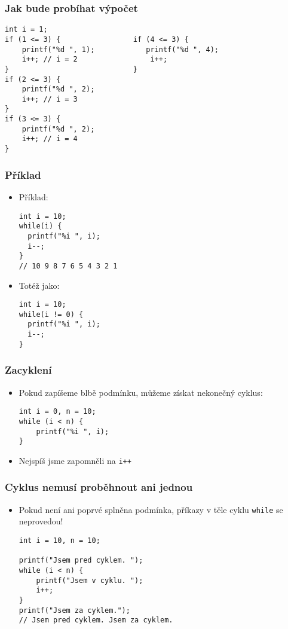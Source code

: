 \documentclass{beamer}
\newenvironment{itemizex}%
  {\large \begin{itemize}%
    \setlength{\itemsep}{8pt}%
    \setlength{\parskip}{8pt}}%
  {\end{itemize}}
\begin{document}
\begin{frame}[t,fragile]\frametitle{Jak bude probíhat výpočet} 
  \begin{verbatim} 
int i = 1;             
if (1 <= 3) {                 if (4 <= 3) {
    printf("%d ", 1);            printf("%d ", 4);
    i++; // i = 2                 i++;
}                             }
if (2 <= 3) {
    printf("%d ", 2);
    i++; // i = 3
}
if (3 <= 3) {
    printf("%d ", 2);
    i++; // i = 4
}
  \end{verbatim}
\end{frame}


\begin{frame}[t,fragile]\frametitle{Příklad} 
  \begin{itemize}
    \item Příklad:
    \begin{verbatim} 
int i = 10;
while(i) {
  printf("%i ", i);
  i--;
}
// 10 9 8 7 6 5 4 3 2 1 
    \end{verbatim}
  \item Totéž jako:
  \begin{verbatim} 
int i = 10;
while(i != 0) {
  printf("%i ", i);
  i--;
}
    \end{verbatim}
  \end{itemize}
\end{frame}


\begin{frame}[t,fragile]\frametitle{Zacyklení} 
  \begin{itemizex}
    \item Pokud zapíšeme blbě podmínku, můžeme získat nekonečný cyklus:
    \begin{verbatim} 
int i = 0, n = 10;
while (i < n) {
    printf("%i ", i);
}
    \end{verbatim}
    \item Nejspíš jsme zapomněli na \texttt{i++}
  \end{itemizex}
\end{frame}


\begin{frame}[t,fragile]\frametitle{Cyklus nemusí proběhnout ani jednou} 
  \begin{itemizex}
    \item Pokud není ani poprvé splněna podmínka, příkazy v těle cyklu \texttt{while} se neprovedou!
    \begin{verbatim} 
int i = 10, n = 10;

printf("Jsem pred cyklem. ");
while (i < n) {
    printf("Jsem v cyklu. ");
    i++;
}
printf("Jsem za cyklem.");
// Jsem pred cyklem. Jsem za cyklem.
    \end{verbatim}
  \end{itemizex}
\end{frame}
\end{document}
